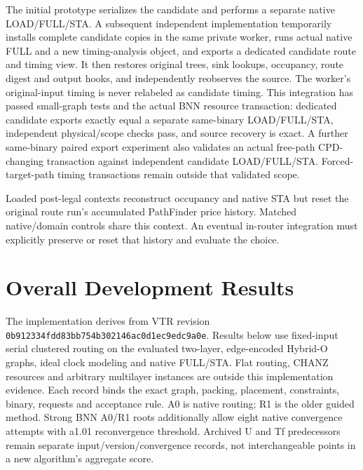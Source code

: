 \documentclass[conference,10pt]{IEEEtran}
\begin{document}
The initial prototype serializes the candidate and performs a separate native LOAD/FULL/STA. A subsequent independent implementation temporarily installs complete candidate copies in the same private worker, runs actual native FULL and a new timing-analysis object, and exports a dedicated candidate route and timing view. It then restores original trees, sink lookups, occupancy, route digest and output hooks, and independently reobserves the source. The worker's original-input timing is never relabeled as candidate timing. This integration has passed small-graph tests and the actual BNN resource transaction: dedicated candidate exports exactly equal a separate same-binary LOAD/FULL/STA, independent physical/scope checks pass, and source recovery is exact. A further same-binary paired export experiment also validates an actual free-path CPD-changing transaction against independent candidate LOAD/FULL/STA. Forced-target-path timing transactions remain outside that validated scope.

Loaded post-legal contexts reconstruct occupancy and native STA but reset the original route run's accumulated PathFinder price history. Matched native/domain controls share this context. An eventual in-router integration must explicitly preserve or reset that history and evaluate the choice.

\section{Overall Development Results}
The implementation derives from VTR revision \texttt{0b912334fdd83bb754b302146ac0d1ec9edc9a0e}. Results below use fixed-input serial clustered routing on the evaluated two-layer, edge-encoded Hybrid-O graphs, ideal clock modeling and native FULL/STA. Flat routing, CHANZ resources and arbitrary multilayer instances are outside this implementation evidence. Each record binds the exact graph, packing, placement, constraints, binary, requests and acceptance rule. A0 is native routing; R1 is the older guided method. Strong BNN A0/R1 roots additionally allow eight native convergence attempts with a1.01 reconvergence threshold. Archived U and Tf predecessors remain separate input/version/convergence records, not interchangeable points in a new algorithm's aggregate score.
\end{document}
